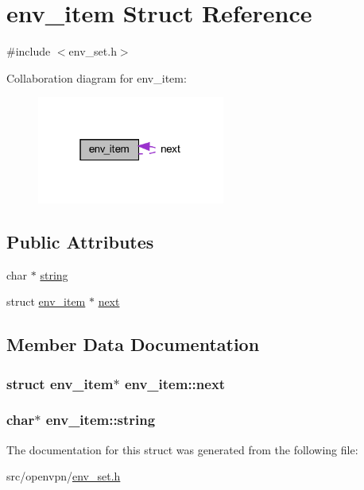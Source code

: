 \hypertarget{structenv__item}{}\section{env\+\_\+item Struct Reference}
\label{structenv__item}


{\ttfamily \#include $<$env\+\_\+set.\+h$>$}



Collaboration diagram for env\+\_\+item\+:
\nopagebreak
\begin{figure}[H]
\begin{center}
\leavevmode
\includegraphics[width=175pt]{structenv__item__coll__graph}
\end{center}
\end{figure}
\subsection*{Public Attributes}
\begin{DoxyCompactItemize}
\item 
char $\ast$ \hyperlink{structenv__item_a9ceec89881d57e9b7cc7568f9e85551a}{string}
\item 
struct \hyperlink{structenv__item}{env\+\_\+item} $\ast$ \hyperlink{structenv__item_addaa2e8fa80b2e201eda2128e7f6eee8}{next}
\end{DoxyCompactItemize}


\subsection{Member Data Documentation}
\hypertarget{structenv__item_addaa2e8fa80b2e201eda2128e7f6eee8}{}
\subsubsection[{next}]{\setlength{\rightskip}{0pt plus 5cm}struct {\bf env\+\_\+item}$\ast$ env\+\_\+item\+::next}\label{structenv__item_addaa2e8fa80b2e201eda2128e7f6eee8}
\hypertarget{structenv__item_a9ceec89881d57e9b7cc7568f9e85551a}{}
\subsubsection[{string}]{\setlength{\rightskip}{0pt plus 5cm}char$\ast$ env\+\_\+item\+::string}\label{structenv__item_a9ceec89881d57e9b7cc7568f9e85551a}


The documentation for this struct was generated from the following file\+:\begin{DoxyCompactItemize}
\item 
src/openvpn/\hyperlink{env__set_8h}{env\+\_\+set.\+h}\end{DoxyCompactItemize}
